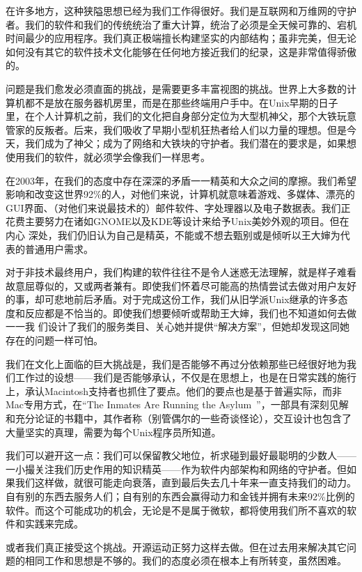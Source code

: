 \documentclass[12pt,oneside]{ctexbook}
\begin{document}
\begin{common-format}
在许多地方，这种狭隘思想已经为我们工作得很好。我们是互联网和万维网的守护者。我们的软件和我们的传统统治了重大计算，统治了必须是全天候可靠的、宕机时间最少的应用程序。我们真正极端擅长构建坚实的内部结构；虽非完美，但无论如何没有其它的软件技术文化能够在任何地方接近我们的纪录，这是非常值得骄傲的。

问题是我们愈发必须直面的挑战，是需要更多丰富视图的挑战。世界上大多数的计算机都不是放在服务器机房里，而是在那些终端用户手中。在Unix早期的日子里，在个人计算机之前，我们的文化把自身部分定位为大型机神父，那个大铁玩意管家的反叛者。后来，我们吸收了早期小型机狂热者给人们以力量的理想。但是今天，我们成为了神父；成为了网络和大铁块的守护者。我们潜在的要求是，如果想使用我们的软件，就必须学会像我们一样思考。

在2003年，在我们的态度中存在深深的矛盾一一精英和大众之间的摩擦。我们希望影响和改变这世界92\%{}的人，对他们来说，计算机就意味着游戏、多媒体、漂亮的GUI界面、（对他们来说最技术的）邮件软件、字处理器以及电子数据表。我们正花费主要努力在诸如GNOME以及KDE等设计来给予Unix美妙外观的项目。但在内心
深处，我们仍旧认为自己是精英，不能或不想去甄别或是倾听以王大婶为代表的普通用户需求。

对于非技术最终用户，我们构建的软件往往不是令人迷惑无法理解，就是样子难看故意屈尊似的，又或两者兼有。即使我们怀着尽可能高的热情尝试去做对用户友好的事，却可悲地前后矛盾。对于完成这份工作，我们从旧学派Unix继承的许多态度和反应都是不恰当的。即使我们想要倾听或帮助王大婶，我们也不知道如何去做一一我
们设计了我们的服务类目、关心她并提供“解决方案”，但她却发现这同她存在的问题一样可怕。

我们在文化上面临的巨大挑战是，我们是否能够不再过分依赖那些已经很好地为我们工作过的设想——我们是否能够承认，不仅是在思想上，也是在日常实践的施行上，承认Macintosh支持者也抓住了要点。他们的要点也是基于普遍实际，而非Mac专用方式，在“The Inmates Are Running the Asylum~\cite{Cooper}”，一部具有深刻见解和充分论证的书籍中，其作者称（别管偶尔的一些奇谈怪论），交互设计也包含了大量坚实的真理，需要为每个Unix程序员所知道。

我们可以避开这一点：我们可以保留教父地位，祈求碰到最好最聪明的少数人——一小撮关注我们历史作用的知识精英——作为软件内部架构和网络的守护者。但如果我们这样做，就很可能走向衰落，直到最后失去几十年来一直支持我们的动力。自有别的东西去服务人们；自有别的东西会赢得动力和金钱并拥有未来92\%{}比例的软件。而这个可能成功的机会，无论是不是属于微软，都将使用我们所不喜欢的软件和实践来完成。

或者我们真正接受这个挑战。开源运动正努力这样去做。但在过去用来解决其它问题的相同工作和思想是不够的。我们的态度必须在根本上有所转变，虽然困难。


\end{common-format}
\end{document}
